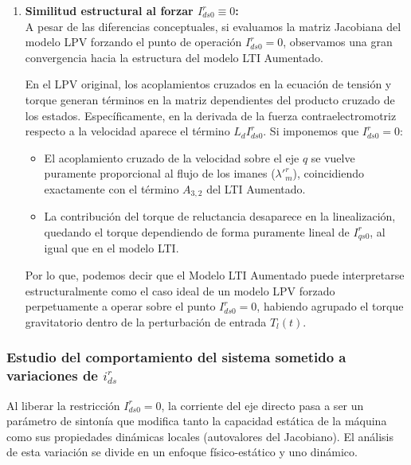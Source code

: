 \documentclass[12pt, a4paper,journal, onecolumn, compsoc]{IEEEtran}
\begin{document}
\begin{enumerate}
    \item \textbf{Similitud estructural al forzar $I_{ds0}^r \equiv 0$:} \\
    A pesar de las diferencias conceptuales, si evaluamos la matriz Jacobiana del modelo LPV forzando el punto de operación $I_{ds0}^r = 0$, observamos una gran convergencia hacia la estructura del modelo LTI Aumentado. 
    
    En el LPV original, los acoplamientos cruzados en la ecuación de tensión y torque generan términos en la matriz dependientes del producto cruzado de los estados. Específicamente, en la derivada de la fuerza contraelectromotriz respecto a la velocidad aparece el término $L_d I_{ds0}^r$. Si imponemos que $I_{ds0}^r = 0$:
    \begin{itemize}
        \item El acoplamiento cruzado de la velocidad sobre el eje $q$ se vuelve puramente proporcional al flujo de los imanes ($\lambda'^r_m$), coincidiendo exactamente con el término $A_{3,2}$ del LTI Aumentado.
        \item La contribución del torque de reluctancia desaparece en la linealización, quedando el torque dependiendo de forma puramente lineal de $I_{qs0}^r$, al igual que en el modelo LTI.
    \end{itemize}
    
    Por lo que, podemos decir que el Modelo LTI Aumentado puede interpretarse estructuralmente como el caso ideal de un modelo LPV forzado perpetuamente a operar sobre el punto $I_{ds0}^r = 0$, habiendo agrupado el torque gravitatorio dentro de la perturbación de entrada $T_l(t)$.
\end{enumerate}
\subsubsection{Estudio del comportamiento del sistema sometido a variaciones de $i_{ds}^r$}
Al liberar la restricción $I_{ds0}^r = 0$, la corriente del eje directo pasa a ser un parámetro de sintonía que modifica tanto la capacidad estática de la máquina como sus propiedades dinámicas locales (autovalores del Jacobiano). El análisis de esta variación se divide en un enfoque físico-estático y uno dinámico.
\end{document}
